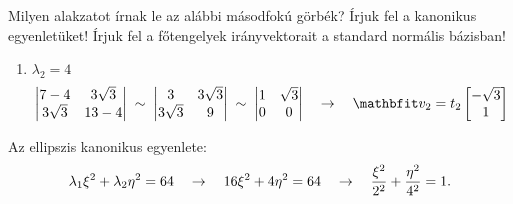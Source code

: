 \begin{exercise}{%
    Milyen alakzatot írnak le az alábbi másodfokú görbék?
    Írjuk fel a kanonikus egyenletüket!
    Írjuk fel a főtengelyek irányvektorait a standard normális bázisban!
  }
{\begin{enumerate}[a)]
\begin{enumerate}[1)]
\[\begin{vmatrix}
                      \end{vmatrix}
                      \quad \rightarrow \quad
                      \rvec v_1 = t_1 \begin{bmatrix}
                        1 \\ \sqrt{3}
                      \end{bmatrix}
                    \]
              \item $\lambda_2 = 4$
                    \[
                      \begin{vmatrix}
                        7 - 4      & 3 \sqrt{3} \\
                        3 \sqrt{3} & 13 - 4
                      \end{vmatrix} \;\sim\; \begin{vmatrix}
                        3          & 3 \sqrt{3} \\
                        3 \sqrt{3} & 9
                      \end{vmatrix} \;\sim\; \begin{vmatrix}
                        1 & \sqrt{3} \\
                        0 & 0
                      \end{vmatrix}
                      \quad \rightarrow \quad
                      \rvec v_2 = t_2 \begin{bmatrix}
                        -\sqrt{3} \\ 1
                      \end{bmatrix}
                    \]
            \end{enumerate}

            Az ellipszis kanonikus egyenlete:
            \[
              \lambda_1 \xi^2 + \lambda_2 \eta^2 = 64
              \quad \rightarrow \quad
              16 \xi^2 + 4 \eta^2 = 64
              \quad \rightarrow \quad
              \frac{\xi^2}{2^2} + \frac{\eta^2}{4^2} = 1
              \text.
            \]

            \begin{center}
\end{center}
\end{enumerate}}
\end{exercise}
